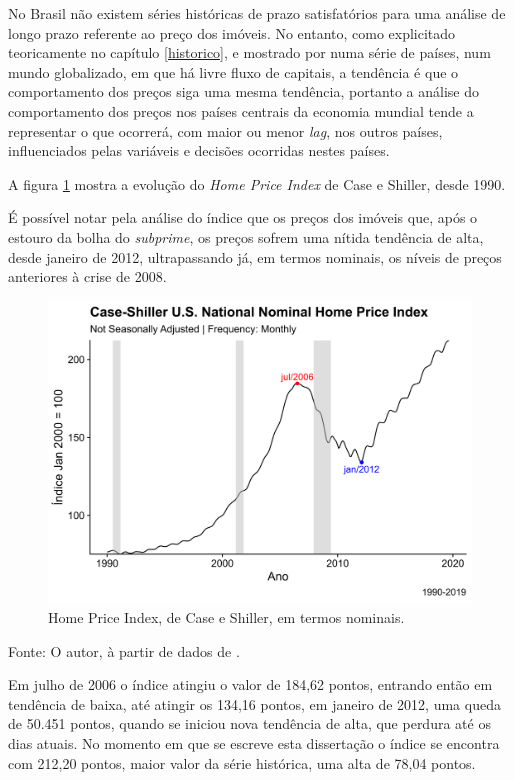 \documentclass[
	12pt,				%
	oneside,			%
	a4paper,			%
	chapter=TITLE,		%
	section=TITLE,		%
	english,			%
	brazil				%
	]{abntex2}
\newcommand{\bcenter}{\begin{center}}
\newcommand{\ecenter}{\end{center}}
\begin{document}
No Brasil não existem séries históricas de prazo satisfatórios para uma
análise de longo prazo referente ao preço dos imóveis. No entanto, como
explicitado teoricamente no capítulo \ref{historico}, e mostrado por
\textcite{ADAMS201038} numa série de países, num mundo globalizado, em
que há livre fluxo de capitais, a tendência é que o comportamento dos
preços siga uma mesma tendência, portanto a análise do comportamento dos
preços nos países centrais da economia mundial tende a representar o que
ocorrerá, com maior ou menor \emph{lag}, nos outros países,
influenciados pelas variáveis e decisões ocorridas nestes países.

A figura \ref{fig:nhpi} mostra a evolução do \emph{Home Price Index} de
Case e Shiller, desde 1990.

É possível notar pela análise do índice que os preços dos imóveis que,
após o estouro da bolha do \emph{subprime}, os preços sofrem uma nítida
tendência de alta, desde janeiro de 2012, ultrapassando já, em termos
nominais, os níveis de preços anteriores à crise de 2008.
\begin{figure}[H]

{\centering \includegraphics[width=0.7\linewidth]{images/nhpi-1} 

}

\caption{Home Price Index, de Case e Shiller, em termos nominais.}\label{fig:nhpi}
\end{figure}
\bcenter
Fonte: O autor, à partir de dados de \textcite{QuandlWIKI}. \ecenter

Em julho de 2006 o índice atingiu o valor de 184,62 pontos, entrando
então em tendência de baixa, até atingir os 134,16 pontos, em janeiro de
2012, uma queda de 50.451 pontos, quando se iniciou nova tendência de
alta, que perdura até os dias atuais. No momento em que se escreve esta
dissertação o índice se encontra com 212,20 pontos, maior valor da série
histórica, uma alta de 78,04 pontos.
\end{document}

